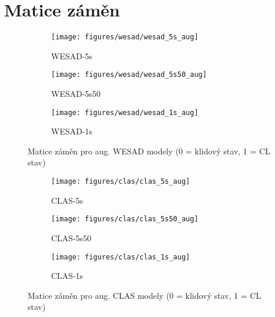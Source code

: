 


\chapter{Matice záměn}
\label{appendix:b}
\vspace{-10mm}
\begin{figure}[!htb]
    \centering
    \begin{subfigure}[h]{0.32\linewidth}
        \texttt{[image: figures/wesad/wesad\_5s\_aug]}
        \caption{WESAD-5s}
    \end{subfigure}
    \hspace{0.05cm}
    \begin{subfigure}[h]{0.32\linewidth}
        \texttt{[image: figures/wesad/wesad\_5s50\_aug]}
        \caption{WESAD-5s50}
    \end{subfigure}
    \hspace{0.05cm}
    \begin{subfigure}[h]{0.32\linewidth}
        \texttt{[image: figures/wesad/wesad\_1s\_aug]}
        \caption{WESAD-1s}
    \end{subfigure}
    \caption{Matice záměn pro aug. WESAD modely (0 = klidový stav, 1 = CL stav)}
\end{figure}

\begin{figure}[!htb]
    \centering
    \begin{subfigure}[h]{0.32\linewidth}
        \texttt{[image: figures/clas/clas\_5s\_aug]}
        \caption{CLAS-5s}
    \end{subfigure}
    \hspace{0.05cm}
    \begin{subfigure}[h]{0.32\linewidth}
        \texttt{[image: figures/clas/clas\_5s50\_aug]}
        \caption{CLAS-5s50}
    \end{subfigure}
    \hspace{0.05cm}
    \begin{subfigure}[h]{0.32\linewidth}
        \texttt{[image: figures/clas/clas\_1s\_aug]}
        \caption{CLAS-1s}
    \end{subfigure}
    \caption{Matice záměn pro aug. CLAS modely (0 = klidový stav, 1 = CL stav)}
\end{figure}

